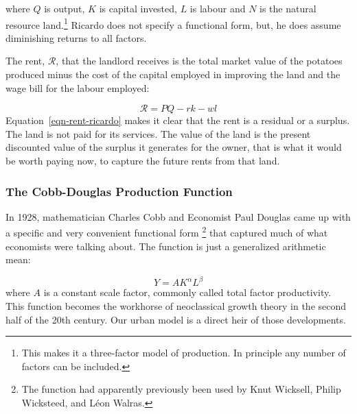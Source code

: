 where  $Q$ is output, $K$ is capital invested, $L$ is labour and $N$  is the natural resource land.\footnote{This makes it a three-factor model of production.  In principle any number of factors can be included.}  
Ricardo does not specify a functional form, but, %
he does assume diminishing returns to all factors. 

The  rent, $\mathcal{R}$, that the landlord receives is the total market value of the potatoes produced minus the cost of the capital employed in improving the land and the wage bill for the labour employed: 

\begin{equation} 
\mathcal{R}= PQ-rk-wl
\label{eqn-rent-ricardo}
\end{equation} 
Equation~\ref{eqn-rent-ricardo} makes it clear that the rent is a residual or a \gls{surplus}. The land is not paid for its services. The value of the land is the \gls{present discounted value} of the surplus it generates for the owner, that is what it would be worth paying now, to capture the future rents from that land.

\subsubsection{The Cobb-Douglas Production Function}

In 1928, mathematician Charles Cobb and Economist Paul Douglas came up with a specific and very convenient functional form \cite{cobbTheoryProduction1928}\footnote{The function had apparently previously been used by Knut Wicksell, Philip Wicksteed, and L\'eon Walras.} that captured much of what economists were talking about. The function is just a generalized arithmetic mean:
 
 \[Y=AK^\alpha L^\beta\]
 where $A$ is a constant scale factor, commonly called \gls{total factor productivity}. This function becomes the workhorse of neoclassical growth theory in the second half  of the 20th century. Our urban model is a direct heir of those developments.



